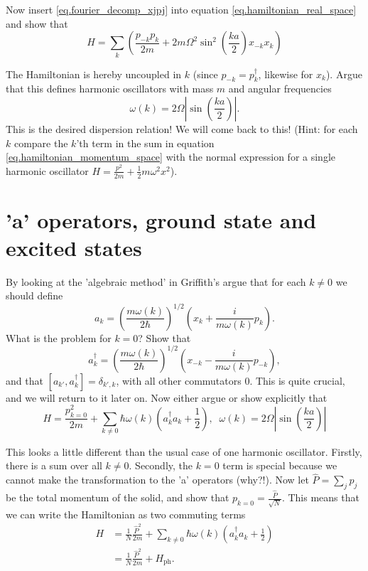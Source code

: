 \documentclass[10pt]{article}
\begin{document}
Now insert \eqref{eq.fourier_decomp_xjpj} into equation \eqref{eq.hamiltonian_real_space} and show that
\begin{equation}
H = \sum_k \left(\frac{p_{-k}p_k}{2m}+2m\Omega^2\sin^2\left(\frac{ka}{2}\right) x_{-k}x_k\right)
\label{eq.hamiltonian_momentum_space}
\end{equation}

The Hamiltonian is hereby uncoupled in $k$ (since $p_{-k}=p_k^\dagger$, likewise for $x_k$). Argue that this defines harmonic oscillators with mass $m$ and angular frequencies
\begin{equation}
\omega(k)= 2\Omega\left|\sin\left(\frac{ka}{2}\right)\right|. 
\end{equation}
This is the desired dispersion relation! We will come back to this! 
(Hint: for each $k$ compare the $k$'th term in the sum in equation \eqref{eq.hamiltonian_momentum_space} with the normal expression for a single harmonic oscillator $H = \frac{p^2}{2m}+\frac{1}{2}m\omega^2 x^2$). 

\section{'a' operators, ground state and excited states}
By looking at the 'algebraic method' in Griffith's argue that for each $k \neq  0$ we should define
\begin{equation}
a_k = \left(\frac{m\omega(k)}{2\hbar}\right)^{1/2}\left(x_k+\frac{i}{m\omega(k)}p_k \right). 
\label{eq.a_operator}
\end{equation}
What is the problem for $k=0$? Show that
\begin{equation}
a_k^\dagger= \left(\frac{m\omega(k)}{2\hbar}\right)^{1/2}\left(x_{-k}-\frac{i}{m\omega(k)}p_{-k} \right), 
\end{equation}
and that $[a_{k'},a_k^\dagger]=\delta_{k',k}$, with all other commutators 0. This is quite crucial, and we will return to it later on. Now either argue or show explicitly that
\begin{equation}
H = \frac{p_{k=0}^2}{2m}+\sum_{k\neq 0}\hbar \omega(k)\left(a_k^\dagger a_k+\frac{1}{2}\right), \; \;  \omega(k)= 2\Omega\left|\sin\left(\frac{ka}{2}\right)\right|
\end{equation}

This looks a little different than the usual case of one harmonic oscillator. Firstly, there is a sum over all $k\neq 0$. Secondly, the $k=0$ term is special because we cannot make the transformation to the 'a' operators (why?!). Now let $\hat{P}=\sum_j p_j$ be the total momentum of the solid, and show that $p_{k=0} = \frac{\hat{P}}{\sqrt{N}}$. This means that we can write the Hamiltonian as two commuting terms
\begin{align}
H &= \frac{1}{N}\frac{\hat{P}^2}{2m} + \sum_{k\neq 0}\hbar \omega(k)\left(a_k^\dagger a_k+\frac{1}{2}\right) \\
    &= \frac{1}{N}\frac{\hat{P}^2}{2m} + H_{\text{ph}}.
\label{eq.hamiltonian_a_operators}
\end{align}
\end{document}
